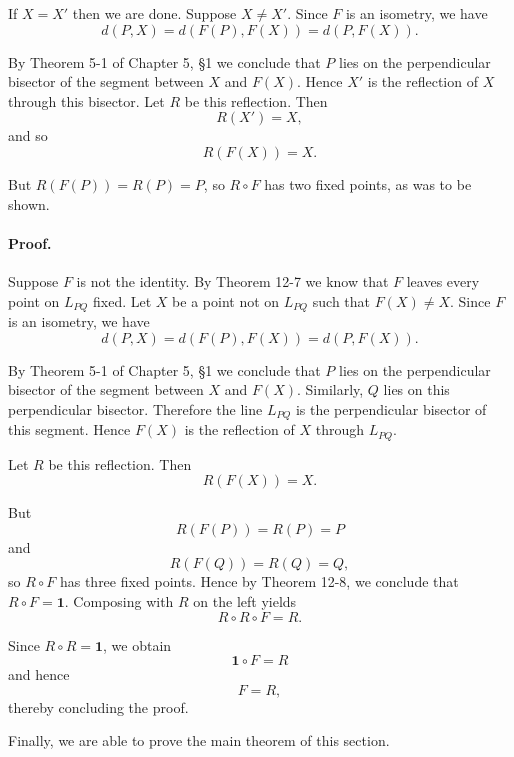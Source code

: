 \documentclass[12pt]{book} %
\begin{document}
\begin{ExerciseList}
\begin{ExerciseList}
\begin{ExerciseList}

If $X = X'$ then we are done. Suppose $X \ne X'$. Since $F$ is an isometry,
we have
\[
d(P,X) = d(F(P),F(X)) = d(P,F(X)).
\]

By Theorem 5-1 of Chapter 5, \S1 we conclude that $P$ lies on the perpendicular bisector of the segment between $X$ and $F(X)$. Hence $X'$ is the
reflection of $X$ through this bisector. Let $R$ be this reflection. Then
\[
R(X') = X,
\]
and so
\[
R(F(X)) = X.
\]

But $R(F(P)) = R(P) = P$, so $R \circ F$ has two fixed points, as was to be
shown.


\paragraph{Proof.}
Suppose $F$ is not the identity. By Theorem 12-7 we know that
$F$ leaves every point on $L_{PQ}$ fixed. Let $X$ be a point not on $L_{PQ}$ such
that $F(X) \ne X$. Since $F$ is an isometry, we have
\[
d(P,X) = d(F(P),F(X)) = d(P,F(X)).
\]

By Theorem 5-1 of Chapter 5, \S1 we conclude that $P$ lies on the perpendicular bisector of the segment between $X$ and $F(X)$. Similarly, $Q$ lies on
this perpendicular bisector. Therefore the line $L_{PQ}$ is the perpendicular
bisector of this segment. Hence $F(X)$ is the reflection of $X$ through $L_{PQ}$.

Let $R$ be this reflection. Then
\[
R(F(X)) = X.
\]

But
\[
R(F(P)) = R(P) = P
\]
and
\[
R(F(Q)) = R(Q) = Q,
\]
so $R \circ F$ has three fixed points. Hence by Theorem 12-8, we conclude
that $R \circ F = \mathbf{1}$. Composing with $R$ on the left yields
\[
R \circ R \circ F = R.
\]

Since $R \circ R = \mathbf{1}$, we obtain
\[
\mathbf{1} \circ F = R
\]
and hence
\[
F = R,
\]
thereby concluding the proof.

Finally, we are able to prove the main theorem of this section.



\end{ExerciseList}
\end{ExerciseList}
\end{ExerciseList}
\end{document}
